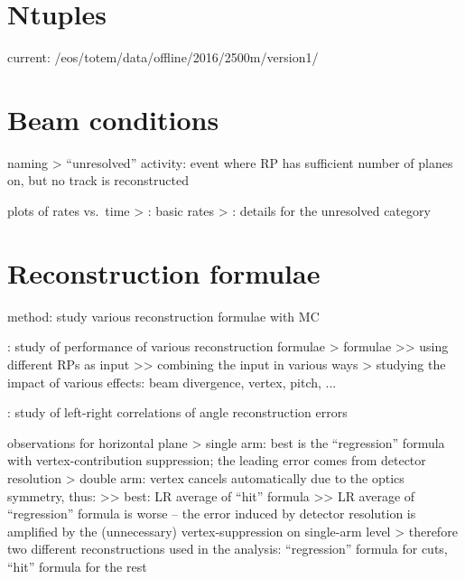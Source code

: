 \section{Ntuples}

\> current: /eos/totem/data/offline/2016/2500m/version1/



\section{Beam conditions}

\> naming
\>> ``unresolved'' activity: event where RP has sufficient number of planes on, but no track is reconstructed

\> plots of rates vs.~time
\>> : basic rates
\>> : details for the unresolved category



\section{Reconstruction formulae}

\> method: study various reconstruction formulae with MC

\>  : study of performance of various reconstruction formulae
\>> formulae
\>>> using different RPs as input
\>>> combining the input in various ways
\>> studying the impact of various effects: beam divergence, vertex, pitch, ...

\>  : study of left-right correlations of angle reconstruction errors

\> observations for horizontal plane
\>> single arm: best is the ``regression'' formula with vertex-contribution suppression; the leading error comes from detector resolution
\>> double arm: vertex cancels automatically due to the optics symmetry, thus:
\>>> best: LR average of ``hit'' formula
\>>> LR average of ``regression'' formula is worse -- the error induced by detector resolution is amplified by the (unnecessary) vertex-suppression on single-arm level
\>> therefore two different reconstructions used in the analysis: ``regression'' formula for cuts, ``hit'' formula for the rest

